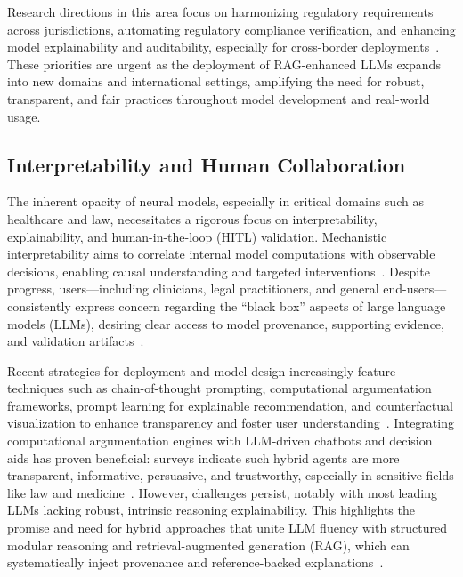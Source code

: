 \documentclass[sigconf]{acmart}
\begin{document}
Research directions in this area focus on harmonizing regulatory requirements across jurisdictions, automating regulatory compliance verification, and enhancing model explainability and auditability, especially for cross-border deployments~\cite{ref17,ref29,ref30}. These priorities are urgent as the deployment of RAG-enhanced LLMs expands into new domains and international settings, amplifying the need for robust, transparent, and fair practices throughout model development and real-world usage.

\subsection{Interpretability and Human Collaboration}

The inherent opacity of neural models, especially in critical domains such as healthcare and law, necessitates a rigorous focus on interpretability, explainability, and human-in-the-loop (HITL) validation. Mechanistic interpretability aims to correlate internal model computations with observable decisions, enabling causal understanding and targeted interventions~\cite{ref13,ref17,ref23,ref27,ref32,ref33,ref34,ref39,ref40,ref41,ref50,ref54,ref55,ref63,ref64}. Despite progress, users—including clinicians, legal practitioners, and general end-users—consistently express concern regarding the “black box” aspects of large language models (LLMs), desiring clear access to model provenance, supporting evidence, and validation artifacts~\cite{ref40,ref54,ref55}.

Recent strategies for deployment and model design increasingly feature techniques such as chain-of-thought prompting, computational argumentation frameworks, prompt learning for explainable recommendation, and counterfactual visualization to enhance transparency and foster user understanding~\cite{ref13,ref27,ref34,ref39,ref41,ref63,ref64}. Integrating computational argumentation engines with LLM-driven chatbots and decision aids has proven beneficial: surveys indicate such hybrid agents are more transparent, informative, persuasive, and trustworthy, especially in sensitive fields like law and medicine~\cite{ref13,ref39,ref40,ref54}. However, challenges persist, notably with most leading LLMs lacking robust, intrinsic reasoning explainability. This highlights the promise and need for hybrid approaches that unite LLM fluency with structured modular reasoning and retrieval-augmented generation (RAG), which can systematically inject provenance and reference-backed explanations~\cite{ref13,ref54,ref55,ref63,ref64}.
\end{document}
